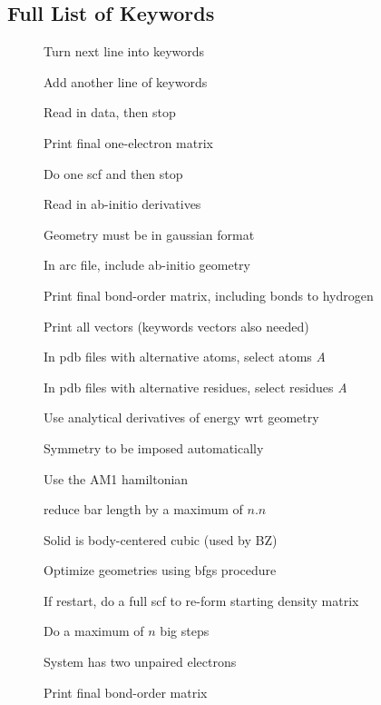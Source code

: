 \subsection{Full List of Keywords}
\addtocounter{table}{1} 
\begin{description}
\item[\comp{\&}] Turn next line into keywords
\item[\comp{+}] Add another line of keywords
\item[] Read in data, then stop
\item[] Print final one-electron matrix
\item[] Do one scf and then stop
\item[] Read in ab-initio derivatives
\item[] Geometry must be in gaussian format
\item[] In arc file, include ab-initio geometry
\item[] Print final bond-order matrix, including bonds to hydrogen
\item[] Print all vectors (keywords vectors also needed)
\item[] In pdb files with alternative atoms, select atoms
{\em A}
\item[] In pdb files with alternative residues, select residues
{\em A}
\item[] Use analytical derivatives of energy wrt geometry
\item[] Symmetry to be imposed automatically
\item[] Use the AM1 hamiltonian
\item[] reduce bar length by a maximum of $n.n$
\item[] Solid is body-centered cubic (used by BZ)
\item[] Optimize geometries using bfgs procedure
\item[] If restart, do a full scf to re-form starting density matrix
\item[] Do  a maximum of $n$ big steps
\item[] System has two unpaired electrons
\item[] Print final bond-order matrix

\end{description}
